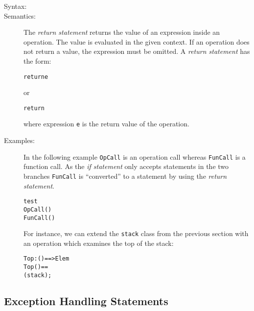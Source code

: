 \documentclass[\pformat,12pt]{article}
\begin{document}
\begin{description}
\item[Syntax:]


\item[Semantics:] The {\it return statement} returns the value of an
  expression inside an operation. The value is evaluated in the given
  context. If an operation does not return a value, the expression must be
  omitted. A {\it return statement\/} has the form:
  \begin{alltt}
    return e
  \end{alltt}
  or
  \begin{alltt}
    return
  \end{alltt}
  where expression {\tt e} is the return value of the operation.

\item[Examples:] In the following example {\tt OpCall} is an operation call
  whereas {\tt FunCall} is a function call. As the {\it if statement\/}
  only accepts statements in the two branches {\tt FunCall} is
  ``converted'' to a statement by using the {\it return statement}.
  \begin{alltt}
     test
     OpCall()
      FunCall()
  \end{alltt}
  For instance, we can extend the \texttt{stack} class from the
  previous section with an operation which examines the top of the
  stack:
\begin{alltt}
  \PUBLIC Top : () ==> Elem
  Top() ==
     ( stack);
\end{alltt}

\end{description}

\subsection{Exception Handling Statements}
\end{document}
